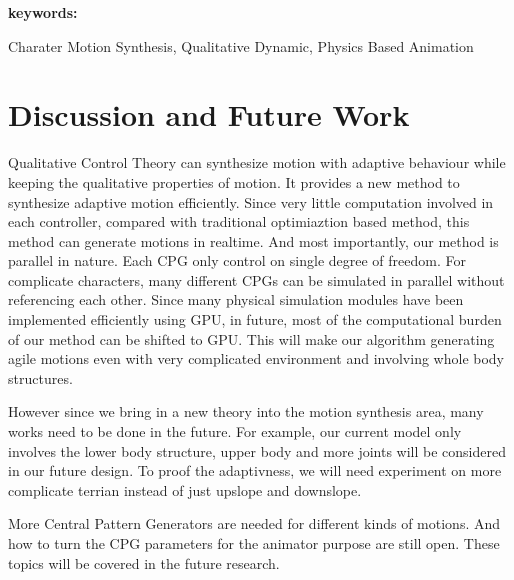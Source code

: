 \documentclass[a4paper]{article}
\begin{document}
{\bf keywords:}

Charater Motion Synthesis, Qualitative Dynamic, Physics Based Animation













\section{Discussion and Future Work}
Qualitative Control Theory can synthesize motion with adaptive behaviour while keeping the qualitative properties of motion.
It provides a new method to synthesize adaptive motion efficiently. Since very little computation involved in each controller, compared with traditional optimiaztion based method, this method can generate motions in realtime. And most importantly, our method is parallel in nature. Each CPG only control on single degree of freedom. For complicate characters, many different CPGs can be simulated in parallel without referencing each other. Since many physical simulation modules have been implemented efficiently using GPU, in future, most of the computational burden of our method can be shifted to GPU. This will make our algorithm generating agile motions even with very complicated environment and involving whole body structures. 


However since we bring in a new theory into the motion synthesis area, many works need to be done in the future. For example, our current model only involves the lower body structure, upper body and more joints will be considered in our future design. To proof the adaptivness, we will need experiment on more complicate terrian instead of just upslope and downslope.

More Central Pattern Generators are needed for different kinds of motions. And how to turn the CPG parameters for the animator purpose are still open.
These topics will be covered in the future research.









\end{document}
